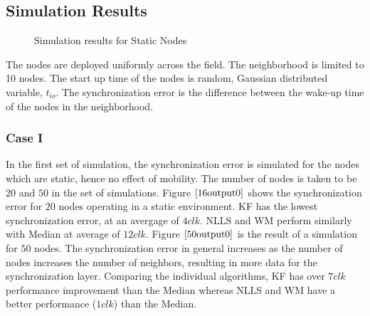 \documentclass[journal]{IEEEtran}
\begin{document}
\subsection{\textbf{Simulation Results}}
\begin{figure}
\centerline{
\hfil
{}}
\caption{Simulation results for Static Nodes }
\label{static}
\end{figure}
The nodes are deployed uniformly across the field. The neighborhood is limited
to 10 nodes. The start up time of the
nodes is random, Gaussian distributed variable, $t_{io}$. The
synchronization error is the difference between the wake-up time of the nodes in the
neighborhood.
\subsubsection{\textbf{Case I}} In the first set of simulation, the
synchronization error is simulated for the nodes which are static,
hence no effect of mobility. The number of nodes is taken to be $20$
and $50$ in the set of simulations.
\newline 
Figure $\ref{16output0}$ shows the synchronization error for $20$ nodes operating in a static environment. KF has the lowest synchronization error, at an avergage of $4clk$. NLLS and WM perform similarly with Median at average of
$12clk$. \newline 
Figure $\ref{50output0}$ is the result of a simulation for $50$ nodes. The synchronization error in general increases as the number of nodes increases the number of neighbors, resulting in more data for the synchronization layer. Comparing the individual algorithms, KF has over $7clk$ performance improvement than the Median whereas NLLS and WM have a better performance ($1clk$) than the Median.
\end{document}
